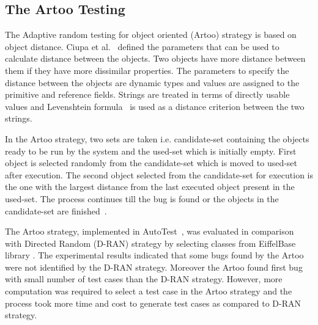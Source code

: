 \subsection{The Artoo Testing}
The Adaptive random testing for object oriented (Artoo) strategy is based on object distance. Ciupa et al.~\cite{ciupa2006object} defined the parameters that can be used to calculate distance between the objects. Two objects have more distance between them if they have more dissimilar properties. The parameters to specify the distance between the objects are dynamic types and values are assigned to the primitive and reference fields. Strings are treated in terms of directly usable values and Levenshtein formula~\cite{levenshtein1966binary} is used as a distance criterion between the two strings.

In the Artoo strategy, two sets are taken i.e. candidate-set containing the objects ready to be run by the system and the used-set which is initially empty. First object is selected randomly from the candidate-set which is moved to used-set after execution. The second object selected from the candidate-set for execution is the one with the largest distance from the last executed object present in the used-set. The process continues till the bug is found or the objects in the candidate-set are finished~\cite{ciupa2006object}.

The Artoo strategy, implemented in AutoTest~\cite{ciupa2008artoo}, was evaluated in comparison with Directed Random (D-RAN) strategy by selecting classes from EiffelBase library \cite{meyer1987eiffel}. The experimental results indicated that some bugs found by the Artoo were not identified by the D-RAN strategy. Moreover the Artoo found first bug with small number of test cases than the D-RAN strategy. However, more computation was required to select a test case in the Artoo strategy and the process took more time and cost to generate test cases as compared to D-RAN strategy.

